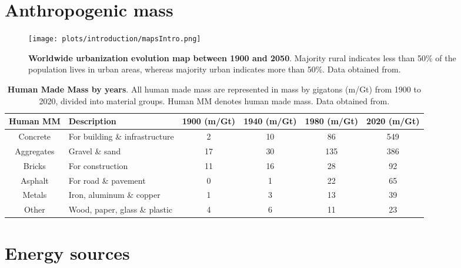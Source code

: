 \section[Anthropogenic mass]{Anthropogenic mass}
\label{sec:anthropogenic_mass}

\begin{figure}[ht!]
  \centering
  \texttt{[image: plots/introduction/mapsIntro.png]}
  \caption[Worldwide urbanization evolution map between 1900 and 2050]{\textbf{Worldwide urbanization evolution map between 1900 and 2050}. Majority rural indicates less than 50\% of the population lives in urban areas, whereas majority urban indicates more than 50\%. Data obtained from.\autocite{ourworldindata_2020}}
  \label{fig:ghg}
\end{figure}

\begin{table}[!htb]
  \caption[Human Made Mass by years]{\textbf{Human Made Mass by years}. All human made mass are represented in mass by gigatons (m/Gt) from 1900 to 2020, divided into material groups. Human MM denotes human made mass. Data obtained from.\autocite{krausmann2017global}}
  \begin{scriptsize}
    \begin{tabulary}{0.65\linewidth}{clcccc}
      \textbf{Human MM} & \textbf{Description} & \textbf{1900 (m/Gt)} & \textbf{1940 (m/Gt)} & \textbf{1980 (m/Gt)} & \textbf{2020 (m/Gt)} \\ \hline
      Concrete & For building \& infrastructure & 2 & 10 & 86 & 549  \\
      Aggregates & Gravel \& sand & 17 & 30 & 135 & 386  \\
      Bricks & For construction & 11 & 16 & 28 & 92  \\
      Asphalt & For road \& pavement & 0 & 1 & 22 & 65  \\
      Metals & Iron, aluminum \& copper & 1 & 3 & 13 & 39  \\
      Other & Wood, paper, glass \& plastic & 4 & 6 & 11 & 23  \\
    \end{tabulary}
  \end{scriptsize}
  \label{tab:hmm_table}
\end{table}

\section[Energy sources]{Energy sources}
\label{sec:energy_sources}



